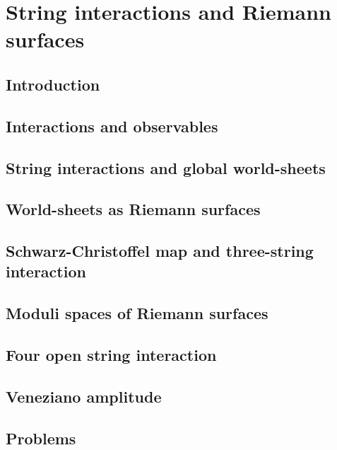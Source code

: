 \documentclass[12pt]{report}
\begin{document}
\chapter{String interactions and Riemann surfaces}
\newpage
\section{Introduction}
\section{Interactions and observables}
\section{String interactions and global world-sheets}
\section{World-sheets as Riemann surfaces}
\section{Schwarz-Christoffel map and three-string interaction}
\section{Moduli spaces of Riemann surfaces}
\section{Four open string interaction}
\section{Veneziano amplitude}
\section{Problems}
\end{document}
